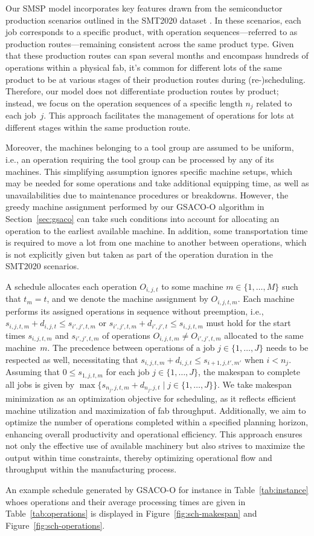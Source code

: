 Our SMSP model incorporates key features drawn from the semiconductor production 
scenarios outlined in the SMT2020 dataset \cite{kopp2020smt2020}. 
In these scenarios, each job corresponds to a specific product, 
with operation sequences—referred to as production routes—remaining 
consistent across the same product type. Given that these production routes 
can span several months and encompass hundreds of operations within a physical fab, 
it's common for different lots of the same product to be at various stages 
of their production routes during (re-)scheduling. 
Therefore, our model does not differentiate production routes by product; 
instead, we focus on the operation sequences of a specific length $n_j$ related to each job~$j$. 
This approach facilitates the management of operations for lots at different stages within the same production route.

Moreover, the machines belonging to a tool group are assumed to be uniform,
i.e., an operation requiring the tool group can be processed by any of its
machines.
This simplifying assumption ignores specific machine setups, which may be
needed for some operations and take additional equipping time,
as well as unavailabilities due to maintenance procedures or breakdowns.
However, the greedy machine assignment performed by our GSACO-O algorithm
in Section~\ref{sec:gsaco} can take such conditions into account for
allocating an operation to the earliest available machine.
In addition, some transportation time is required to move
a lot from one machine to another between operations,
which is not explicitly given but taken as part of the operation duration
in the SMT2020 scenarios.

A schedule allocates each operation $O_{i,j,t}$ to some machine
$m\in\{1,\dots,M\}$ such that $t_m=t$, and we denote the machine
assignment by $O_{i,j,t,m}$.
Each machine performs its assigned operations in sequence without
preemption, i.e.,
$s_{i,j,t,m} + d_{i,j,t} \leq s_{i',j',t,m}$ or
$s_{i',j',t,m} + d_{i',j',t} \leq s_{i,j,t,m}$
must hold for the start times
$s_{i,j,t,m}$ and $s_{i',j',t,m}$ of operations
$O_{i,j,t,m}\neq O_{i',j',t,m}$
allocated to the same machine~$m$.
The precedence between operations of a job $j\in\{1,\dots,J\}$ needs to be
respected as well, necessitating that
$s_{i,j,t,m} + d_{i,j,t} \leq s_{i+1,j,t',m'}$ when $i<n_j$.
Assuming that $0\leq s_{1,j,t,m}$ for each job $j\in\{1,\dots,J\}$,
the makespan to complete all jobs is given by
$\max\{s_{n_j,j,t,m} + d_{n_j,j,t} \mid j\in\{1,\dots,J\}\}$.
We take makespan minimization as an optimization objective for scheduling, as it reflects efficient machine utilization and maximization of fab throughput. Additionally, we aim to optimize the number of operations completed within a specified planning horizon, enhancing overall productivity and operational efficiency. This approach ensures not only the effective use of available machinery but also strives to maximize the output within time constraints, thereby optimizing operational flow and throughput within the manufacturing process.

An example schedule generated by GSACO-O for instance in Table~\ref{tab:instance} whoes operations and their average processing times are given in Table~\ref{tab:operations} is displayed in Figure~\ref{fig:sch-makespan} and Figure~\ref{fig:sch-operations}.